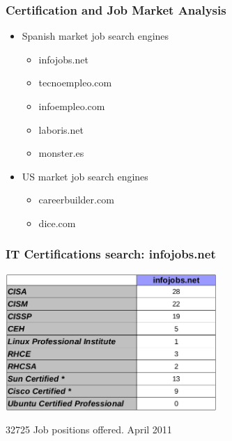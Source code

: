 \documentclass{beamer}
\begin{document}

\begin{frame}
\frametitle{Certification and Job Market Analysis}
\begin{itemize}

\item Spanish market job search engines
  \begin{itemize}
  \item infojobs.net
  \item tecnoempleo.com	
  \item infoempleo.com	
  \item laboris.net
  \item monster.es
  \end{itemize}

\item US market job search engines
  \begin{itemize}
  \item careerbuilder.com
  \item dice.com
  \end{itemize}

\end{itemize}

\end{frame}


\begin{frame}
\frametitle{IT Certifications search: infojobs.net}
\begin{center}
  \includegraphics[width=8cm]{figs/infojobs.png}
\end{center}
\begin{center}
\normalsize{32725 Job positions offered. April 2011}
\end{center}
\end{frame}

\end{document}
